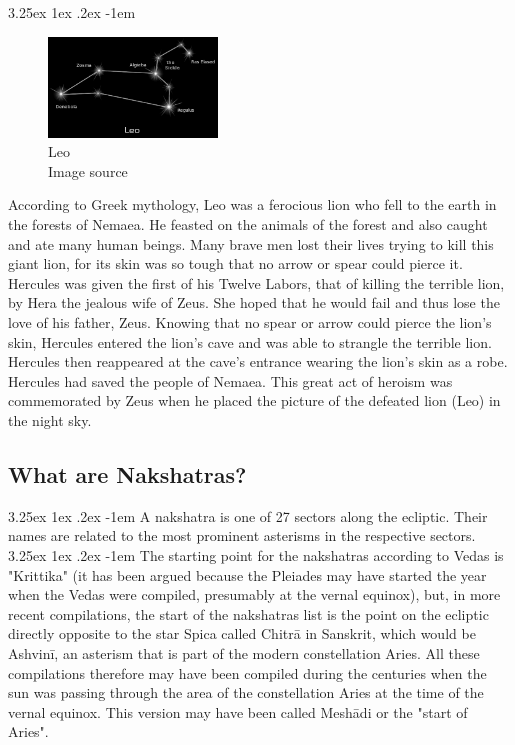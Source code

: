 \documentclass[a4paper,twoside,11pt]{article}
\makeatletter
\numberwithin{equation}{section}
\renewcommand\paragraph{\@startsection{paragraph}{5}{\z@}%
  {3.25ex \@plus1ex \@minus.2ex}%
  {-1em}%
  {\normalfont\normalsize\bfseries}}
\makeatother
\begin{document}
\paragraph{}
\begin{figure}[h]
\centering
\includegraphics[width=0.4\textwidth]{fig23.jpg}
\caption{Leo \\ Image source \cite{Leo}}
\label{fig23}
\end{figure}
According to Greek mythology, Leo was a ferocious lion who fell to the earth in the forests of Nemaea. He feasted on the animals of the forest and also caught and ate many human beings. Many brave men lost their lives trying to kill this giant lion, for its skin was so tough that no arrow or spear could pierce it. Hercules was given the first of his Twelve Labors, that of killing the terrible lion, by Hera the jealous wife of Zeus. She hoped that he would fail and thus lose the love of his father, Zeus. Knowing that no spear or arrow could pierce the lion’s skin, Hercules entered the lion’s cave and was able to strangle the terrible lion. Hercules then reappeared at the cave’s entrance wearing the lion’s skin as a robe. Hercules had saved the people of Nemaea. This great act of heroism was commemorated by Zeus when he placed the picture of the defeated lion (Leo) in the night sky.

\subsection{What are Nakshatras?}
\paragraph{}
A nakshatra is one of 27 sectors along the ecliptic. Their names are related to the most prominent asterisms in the respective sectors.
\paragraph{}
The starting point for the nakshatras according to Vedas is "Krittika" (it has been argued because the Pleiades may have started the year when the Vedas were compiled, presumably at the vernal equinox), but, in more recent compilations, the start of the nakshatras list is the point on the ecliptic directly opposite to the star Spica called Chitrā in Sanskrit, which would be Ashvinī, an asterism that is part of the modern constellation Aries. All these compilations therefore may have been compiled during the centuries when the sun was passing through the area of the constellation Aries at the time of the vernal equinox. This version may have been called Meshādi or the "start of Aries".
\end{document}
